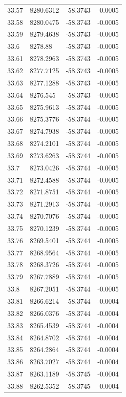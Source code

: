 \begin{table}[H]
\begin{tabular}{llll}
33.57 & 8280.6312 & -58.3743 & -0.0005 \\
33.58 & 8280.0475 & -58.3743 & -0.0005 \\
33.59 & 8279.4638 & -58.3743 & -0.0005 \\
33.6 & 8278.88 & -58.3743 & -0.0005 \\
33.61 & 8278.2963 & -58.3743 & -0.0005 \\
33.62 & 8277.7125 & -58.3743 & -0.0005 \\
33.63 & 8277.1288 & -58.3743 & -0.0005 \\
33.64 & 8276.545 & -58.3743 & -0.0005 \\
33.65 & 8275.9613 & -58.3744 & -0.0005 \\
33.66 & 8275.3776 & -58.3744 & -0.0005 \\
33.67 & 8274.7938 & -58.3744 & -0.0005 \\
33.68 & 8274.2101 & -58.3744 & -0.0005 \\
33.69 & 8273.6263 & -58.3744 & -0.0005 \\
33.7 & 8273.0426 & -58.3744 & -0.0005 \\
33.71 & 8272.4588 & -58.3744 & -0.0005 \\
33.72 & 8271.8751 & -58.3744 & -0.0005 \\
33.73 & 8271.2913 & -58.3744 & -0.0005 \\
33.74 & 8270.7076 & -58.3744 & -0.0005 \\
33.75 & 8270.1239 & -58.3744 & -0.0005 \\
33.76 & 8269.5401 & -58.3744 & -0.0005 \\
33.77 & 8268.9564 & -58.3744 & -0.0005 \\
33.78 & 8268.3726 & -58.3744 & -0.0005 \\
33.79 & 8267.7889 & -58.3744 & -0.0005 \\
33.8 & 8267.2051 & -58.3744 & -0.0005 \\
33.81 & 8266.6214 & -58.3744 & -0.0004 \\
33.82 & 8266.0376 & -58.3744 & -0.0004 \\
33.83 & 8265.4539 & -58.3744 & -0.0004 \\
33.84 & 8264.8702 & -58.3744 & -0.0004 \\
33.85 & 8264.2864 & -58.3744 & -0.0004 \\
33.86 & 8263.7027 & -58.3744 & -0.0004 \\
33.87 & 8263.1189 & -58.3745 & -0.0004 \\
33.88 & 8262.5352 & -58.3745 & -0.0004 \\

\end{tabular}
\end{table}
